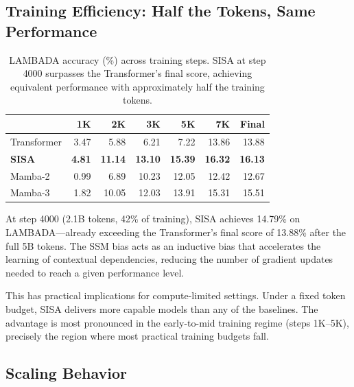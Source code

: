 \documentclass[11pt]{article}
\begin{document}
\subsection{Training Efficiency: Half the Tokens, Same Performance}

\begin{table}[h]
\centering
\caption{LAMBADA accuracy (\%) across training steps. SISA at step 4000 surpasses the Transformer's final score, achieving equivalent performance with approximately half the training tokens.}
\label{tab:efficiency}
\begin{tabular}{lrrrrrr}
\toprule
& \textbf{1K} & \textbf{2K} & \textbf{3K} & \textbf{5K} & \textbf{7K} & \textbf{Final} \\
\midrule
Transformer & 3.47 & 5.88 & 6.21 & 7.22 & 13.86 & 13.88 \\
\textbf{SISA} & \textbf{4.81} & \textbf{11.14} & \textbf{13.10} & \textbf{15.39} & \textbf{16.32} & \textbf{16.13} \\
Mamba-2 & 0.99 & 6.89 & 10.23 & 12.05 & 12.42 & 12.67 \\
Mamba-3 & 1.82 & 10.05 & 12.03 & 13.91 & 15.31 & 15.51 \\
\bottomrule
\end{tabular}
\end{table}

At step 4000 (2.1B tokens, 42\% of training), SISA achieves 14.79\% on LAMBADA---already exceeding the Transformer's final score of 13.88\% after the full 5B tokens. The SSM bias acts as an inductive bias that accelerates the learning of contextual dependencies, reducing the number of gradient updates needed to reach a given performance level.

This has practical implications for compute-limited settings. Under a fixed token budget, SISA delivers more capable models than any of the baselines. The advantage is most pronounced in the early-to-mid training regime (steps 1K--5K), precisely the region where most practical training budgets fall.

\subsection{Scaling Behavior}
\end{document}
